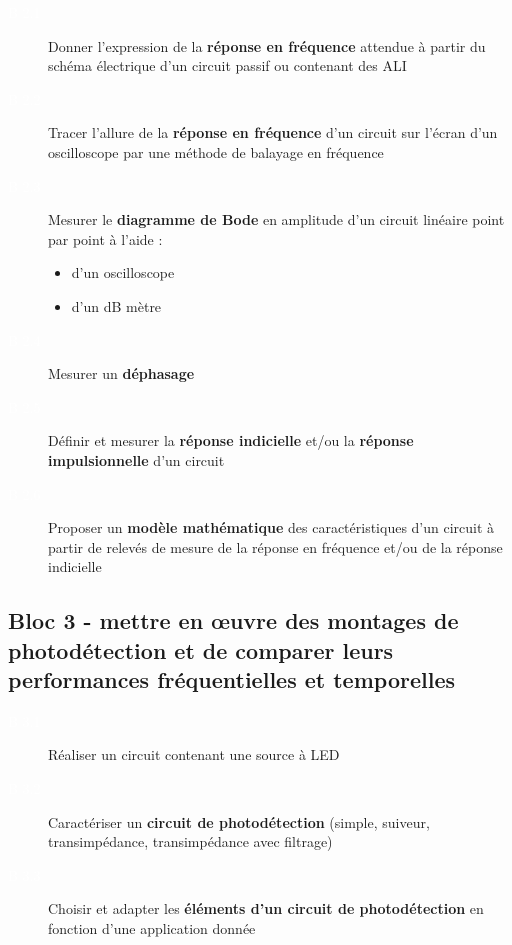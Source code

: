 \documentclass[a4paper,11pt,twoside]{book} %
\begin{document}
{\begin{description}
	\item[\colorbox{violet_iogs!70}{\textcolor{white}{B 2.1}}] Donner l'expression de la \textbf{réponse en fréquence} attendue à partir du schéma électrique d'un circuit passif ou contenant des ALI
	\item[\colorbox{violet_iogs!70}{\textcolor{white}{B 2.2}}] Tracer l'allure de la \textbf{réponse en fréquence} d'un circuit sur l'écran d'un oscilloscope par une méthode de balayage en fréquence
	\item[\colorbox{violet_iogs!70}{\textcolor{white}{B 2.3}}] Mesurer le \textbf{diagramme de Bode} en amplitude  d'un circuit linéaire point par point à l'aide :
	\begin{itemize}
		\item d'un oscilloscope
		\item d'un dB mètre
	\end{itemize}
	\item[\colorbox{violet_iogs!70}{\textcolor{white}{B 2.4}}] Mesurer un \textbf{déphasage}
	\item[\colorbox{violet_iogs!70}{\textcolor{white}{B 2.5}}] Définir et mesurer la \textbf{réponse indicielle} et/ou la \textbf{réponse impulsionnelle} d'un circuit
	\item[\colorbox{violet_iogs!70}{\textcolor{white}{B 2.6}}] Proposer un \textbf{modèle mathématique} des caractéristiques d'un circuit à partir de relevés de mesure de la réponse en fréquence et/ou de la réponse indicielle
\end{description}

\subsection{Bloc 3 - mettre en \oe{}uvre des montages de photodétection et de comparer leurs performances fréquentielles et temporelles}

\begin{description}
	\item[\colorbox{violet_iogs!70}{\textcolor{white}{B 3.1}}] Réaliser un circuit contenant une source à LED
	\item[\colorbox{violet_iogs!70}{\textcolor{white}{B 3.2}}] Caractériser un \textbf{circuit de photodétection} (simple, suiveur, transimpédance, transimpédance avec filtrage)
	\item[\colorbox{violet_iogs!70}{\textcolor{white}{B 3.3}}] Choisir et adapter les \textbf{éléments d'un circuit de photodétection} en fonction d'une application donnée
\end{description}

}
\end{document}
